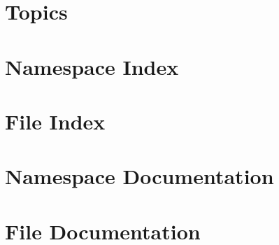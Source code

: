 \documentclass[twoside]{book}
\newcommand{\+}{\discretionary{\mbox{\scriptsize$\hookleftarrow$}}{}{}}
\newcommand{\clearemptydoublepage}{%
  \newpage{\pagestyle{empty}\cleardoublepage}%
}
\begin{document}
\chapter{Topics}
\label{md_markdown_topics}

\chapter{Namespace Index}

\chapter{File Index}

\chapter{Namespace Documentation}

\chapter{File Documentation}

















\backmatter
\newpage
{}
\clearemptydoublepage
{}
\printindex
\end{document}
